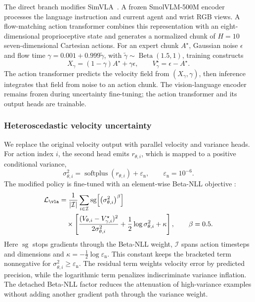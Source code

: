 The direct branch modifies SimVLA~\cite{simvla}. A frozen SmolVLM-500M encoder
processes the language instruction and current agent and wrist RGB views. A
flow-matching action transformer combines this representation with an
eight-dimensional proprioceptive state and generates a normalized chunk of
\(H=10\) seven-dimensional Cartesian actions. For an expert chunk
\(A^\star\), Gaussian noise \(\epsilon\) and flow time
\(\gamma=0.001+0.999\tilde{\gamma}\), with
\(\tilde{\gamma}\sim\operatorname{Beta}(1.5,1)\), training constructs
\begin{equation}
  X_\gamma=(1-\gamma)A^\star+\gamma\epsilon,
  \qquad
  V^\star_\gamma=\epsilon-A^\star .
  \label{eq:vla-flow}
\end{equation}
The action transformer predicts the velocity field from
\((X_\gamma,\gamma)\), then inference integrates that field from noise to an
action chunk. The vision-language encoder remains frozen during uncertainty
fine-tuning; the action transformer and its output heads are trainable.

\subsubsection{Heteroscedastic velocity uncertainty}

We replace the original velocity output with parallel velocity and variance
heads. For action index \(i\), the second head emits \(r_{\theta,i}\), which is
mapped to a positive conditional variance,
\begin{equation}
  \sigma^2_{\theta,i}
  =\operatorname{softplus}(r_{\theta,i})+\varepsilon_{\mathrm{n}},
  \qquad \varepsilon_{\mathrm{n}}=10^{-6}.
  \label{eq:vla-variance}
\end{equation}
The modified policy is fine-tuned with an element-wise Beta-NLL objective
\cite{betanll}:
\begin{equation}
  \begin{aligned}
    \mathcal{L}_{\vla}
    &=
    \frac{1}{|\mathcal I|}
    \sum_{i\in\mathcal I}
    \operatorname{sg}\!\left[
      \left(\sigma^2_{\theta,i}\right)^\beta
    \right] \\
    &\quad{}\times
    \left[
      \frac{(V_{\theta,i}-V^\star_{\gamma,i})^2}
           {2\sigma^2_{\theta,i}}
      +\frac{1}{2}\log\sigma^2_{\theta,i}
      +\kappa
    \right],
    \qquad \beta=0.5 .
  \end{aligned}
  \label{eq:vla-beta-nll}
\end{equation}
Here \(\operatorname{sg}\) stops gradients through the Beta-NLL weight,
\(\mathcal I\) spans action timesteps and dimensions and
\(\kappa=-\tfrac{1}{2}\log\varepsilon_{\mathrm{n}}\). This constant keeps the
bracketed term nonnegative for
\(\sigma^2_{\theta,i}\geq\varepsilon_{\mathrm{n}}\). The residual term weights
velocity error by predicted precision, while the logarithmic term penalizes
indiscriminate variance inflation. The detached Beta-NLL factor reduces the
attenuation of high-variance examples without adding another gradient path
through the variance weight.

